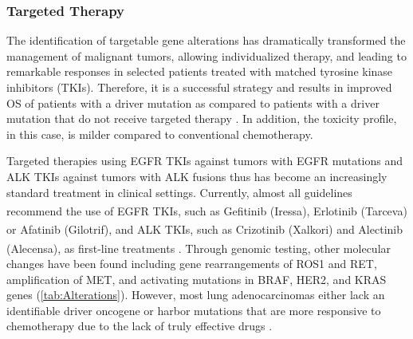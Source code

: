 \subsubsection{Targeted Therapy} \label{sec:Targeted}

The identification of targetable gene alterations has dramatically transformed the management of malignant tumors, allowing individualized therapy, and leading to remarkable responses in selected patients treated with matched tyrosine kinase inhibitors (TKIs). Therefore, it is a successful strategy and results in improved OS of patients with a driver mutation as compared to patients with a driver mutation that do not receive targeted therapy \cite{Targeted_drugs}. In addition, the toxicity profile, in this case, is milder compared to conventional chemotherapy.

Targeted therapies using EGFR TKIs against tumors with EGFR mutations and ALK TKIs against tumors with ALK fusions thus has become an increasingly standard treatment in clinical settings. Currently, almost all guidelines recommend the use of EGFR TKIs, such as Gefitinib (Iressa\textsuperscript\textregistered{}), Erlotinib (Tarceva\textsuperscript\textregistered{}) or Afatinib (Gilotrif\textsuperscript\textregistered{}), and ALK TKIs, such as Crizotinib (Xalkori\textsuperscript\textregistered{}) and Alectinib (Alecensa\textsuperscript\textregistered{}), as first-line treatments \cite{Mol_bio, ALK_fusions, NSCLC_therapies}. Through genomic testing, other molecular changes have been found including gene rearrangements of ROS1 and RET, amplification of MET, and activating mutations in BRAF, HER2, and KRAS genes (\autoref{tab:Alterations}). However, most lung adenocarcinomas either lack an identifiable driver oncogene or harbor mutations that are more responsive to chemotherapy due to the lack of truly effective drugs \cite{Mol_profiling}.

